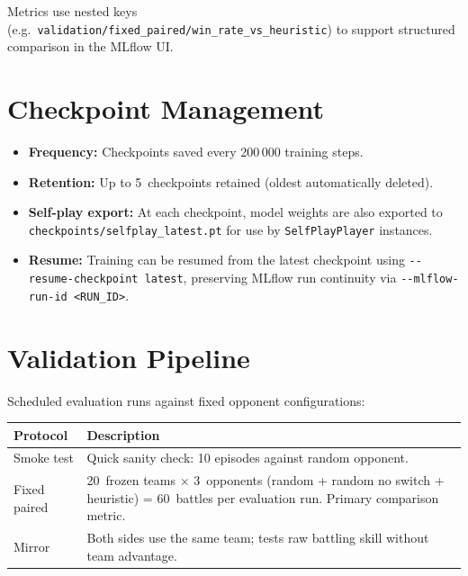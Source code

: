 Metrics use nested keys (e.g.\
\texttt{validation/fixed\_paired/win\_rate\_vs\_heuristic}) to support
structured comparison in the MLflow UI.


\section{Checkpoint Management}

\begin{itemize}
  \item \textbf{Frequency:} Checkpoints saved every 200\,000 training steps.
  \item \textbf{Retention:} Up to 5~checkpoints retained (oldest automatically
        deleted).
  \item \textbf{Self-play export:} At each checkpoint, model weights are also
        exported to \texttt{checkpoints/selfplay\_latest.pt} for use by
        \texttt{SelfPlayPlayer} instances.
  \item \textbf{Resume:} Training can be resumed from the latest checkpoint
        using \texttt{-{}-resume-checkpoint latest}, preserving MLflow run
        continuity via \texttt{-{}-mlflow-run-id <RUN\_ID>}.
\end{itemize}

\section{Validation Pipeline}

Scheduled evaluation runs against fixed opponent configurations:

\begin{center}
\small
\begin{tabularx}{\textwidth}{l X}
  \toprule
  \textbf{Protocol} & \textbf{Description} \\
  \midrule
  Smoke test     & Quick sanity check: 10 episodes against random opponent. \\
  Fixed paired   & 20~frozen teams $\times$ 3~opponents (random + random no switch + heuristic) =
                   60~battles per evaluation run.  Primary comparison metric. \\
  Mirror         & Both sides use the same team; tests raw battling skill
                   without team advantage. \\
  \bottomrule
\end{tabularx}
\end{center}

